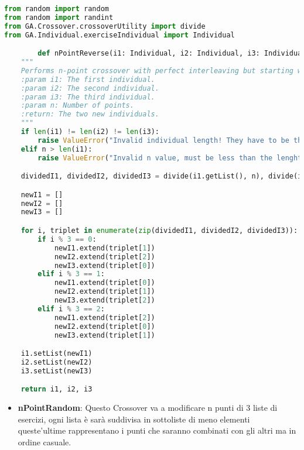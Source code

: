 \documentclass{article}
\begin{document}
\begin{lstlisting}[language=Python, breaklines, no caption]
from random import random
from random import randint
from GA.Crossover.crossoverUtility import divide
from GA.Individual.exerciseIndividual import Individual

        def nPointReverse(i1: Individual, i2: Individual, i3: Individual, n: int) -> tuple[Individual, Individual, Individual]:
    """
    Performs n-point crossover with perfect interleaving but starting with a switch.
    :param i1: The first individual.
    :param i2: The second individual.
    :param i3: The third individual.
    :param n: Number of points.
    :return: The two new individuals.
    """
    if len(i1) != len(i2) != len(i3):
        raise ValueError("Invalid individual length! They have to be the same.")
    elif n > len(i1):
        raise ValueError("Invalid n value, must be less than the lenght of the individual!")

    dividedI1, dividedI2, dividedI3 = divide(i1.getList(), n), divide(i2.getList(), n), divide(i3.getList(), n)

    newI1 = []
    newI2 = []
    newI3 = []

    for i, triplet in enumerate(zip(dividedI1, dividedI2, dividedI3)):
        if i % 3 == 0:
            newI1.extend(triplet[1])
            newI2.extend(triplet[2])
            newI3.extend(triplet[0])
        elif i % 3 == 1:
            newI1.extend(triplet[0])
            newI2.extend(triplet[1])
            newI3.extend(triplet[2])
        elif i % 3 == 2:
            newI1.extend(triplet[2])
            newI2.extend(triplet[0])
            newI3.extend(triplet[1])

    i1.setList(newI1)
    i2.setList(newI2)
    i3.setList(newI3)

    return i1, i2, i3
        \end{lstlisting}

\begin{itemize}
\item\textbf{nPointRandom}: Questo Crossover va a modificare n punti di 3 liste di esercizi, ogni lista è sarà suddivisa in sottoliste di meno elementi queste'ultime rappresentano i punti che saranno combinati con gli altri ma in ordine casuale.
\end{itemize}
\end{document}
